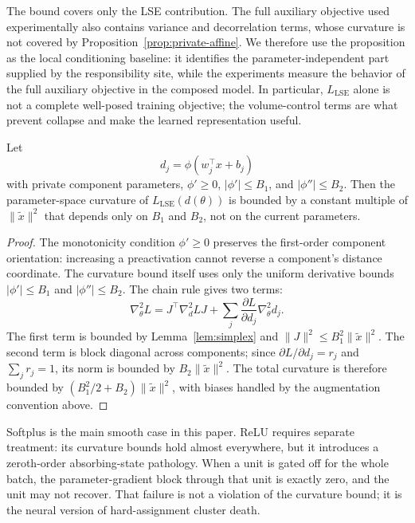 The bound covers only the LSE contribution. The full auxiliary objective used
experimentally also contains variance and decorrelation terms, whose curvature
is not covered by Proposition~\ref{prop:private-affine}. We therefore use the
proposition as the local conditioning baseline: it identifies the
parameter-independent part supplied by the responsibility site, while the
experiments measure the behavior of the full auxiliary objective in the
composed model. In particular, $L_{\mathrm{LSE}}$ alone is not a complete
well-posed training objective; the volume-control terms are what prevent
collapse and make the learned representation useful.

\begin{proposition}
\label{prop:smooth-kernel}
Let
\[
    d_j = \phi(w_j^\top x+b_j)
\]
with private component parameters, $\phi'\ge 0$, $|\phi'|\le B_1$, and
$|\phi''|\le B_2$. Then the parameter-space curvature of
$L_{\mathrm{LSE}}(d(\theta))$ is bounded by a constant multiple of
$\|\tilde{x}\|^2$ that depends only on $B_1$ and $B_2$, not on the current
parameters.
\end{proposition}
\begin{proof}
The monotonicity condition $\phi'\ge 0$ preserves the first-order component
orientation: increasing a preactivation cannot reverse a component's distance
coordinate. The curvature bound itself uses only the uniform derivative bounds
$|\phi'|\le B_1$ and $|\phi''|\le B_2$.
The chain rule gives two terms:
\[
    \nabla_\theta^2 L
    =
    J^\top \nabla_d^2 L J
    +
    \sum_j \frac{\partial L}{\partial d_j}\nabla_\theta^2 d_j.
\]
The first term is bounded by Lemma~\ref{lem:simplex} and
$\|J\|^2\le B_1^2\|\tilde{x}\|^2$. The second term is block diagonal across
components; since $\partial L/\partial d_j=r_j$ and $\sum_j r_j=1$, its norm
is bounded by $B_2\|\tilde{x}\|^2$. The total curvature is therefore bounded
by $(B_1^2/2+B_2)\|\tilde{x}\|^2$, with biases handled by the augmentation
convention above.
\end{proof}
Softplus is the main smooth case in this paper. ReLU requires separate
treatment: its curvature bounds hold almost everywhere, but it introduces a
zeroth-order absorbing-state pathology. When a unit is gated off for the whole
batch, the parameter-gradient block through that unit is exactly zero, and the
unit may not recover. That failure is not a violation of the curvature bound;
it is the neural version of hard-assignment cluster death.

